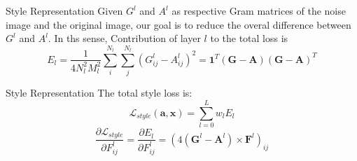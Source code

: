 \documentclass{beamer}
\begin{document}
\begin{frame}{Style Representation}
Given $G^l$ and $A^l$ as respective Gram matrices of the
noise image and the original image, our goal is to reduce the overal difference
between $G^l$ and $A^l$. In ths sense,
Contribution of layer $l$ to the total loss is
\begin{equation}
    E_l = \frac{1}{4N_l^2M_l^2} \sum_{i}^{N_l}\sum_{j}^{N_l}{(G^l_{ij} - A^l_{ij})^2}
    = \mathbf{1}^T(\mathbf{G} - \mathbf{A})(\mathbf{G} - \mathbf{A})^T
\end{equation}
\end{frame}

\begin{frame}{Style Representation}
The total style loss is:
\begin{equation}
    \mathcal{L}_{style}(\mathbf{a}, \mathbf{x}) = \sum_{l=0}^L {w_l E_l }
\end{equation}
\begin{equation}
    \frac{\partial \mathcal{L}_{style}}{\partial F^l_{ij}} = \frac{\partial E_l}{\partial F^l_{ij}} =
    (4(\mathbf{G}^l - \mathbf{A}^l) \times \mathbf{F}^l)_{ij}
\end{equation}
\end{frame}
\end{document}
